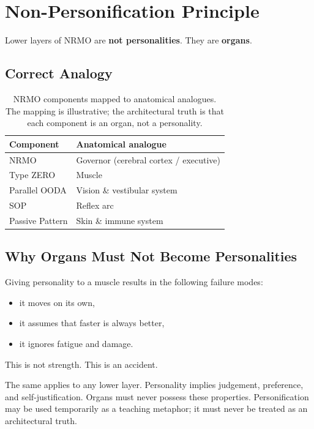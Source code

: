 \section{Non-Personification Principle}
\label{sec:foundational-non-personification}

Lower layers of NRMO are \textbf{not personalities}. They are
\textbf{organs}.

\subsection{Correct Analogy}
\label{sec:non-personification-analogy}

\begin{table}[ht]
\centering
\begin{tabular}{ll}
\toprule
\textbf{Component} & \textbf{Anatomical analogue} \\
\midrule
NRMO & Governor (cerebral cortex / executive) \\
Type ZERO & Muscle \\
Parallel OODA & Vision \& vestibular system \\
SOP & Reflex arc \\
Passive Pattern & Skin \& immune system \\
\bottomrule
\end{tabular}
\caption[Anatomical analogues]{NRMO components mapped to anatomical
analogues. The mapping is illustrative; the architectural truth is
that each component is an organ, not a personality.}
\label{tab:nrmo-organs}
\end{table}

\subsection{Why Organs Must Not Become Personalities}
\label{sec:non-personification-rationale}

Giving personality to a muscle results in the following failure
modes:

\begin{itemize}
\item it moves on its own,
\item it assumes that faster is always better,
\item it ignores fatigue and damage.
\end{itemize}

\noindent
This is not strength. This is an accident.

The same applies to any lower layer. Personality implies judgement,
preference, and self-justification. Organs must never possess these
properties. Personification may be used temporarily as a teaching
metaphor; it must never be treated as an architectural truth.

